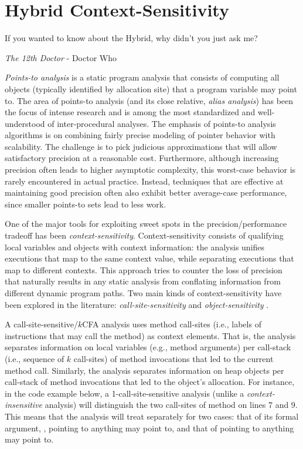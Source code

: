 \chapter{Hybrid Context-Sensitivity}\label{chapter:hybrid}

\epigraph{If you wanted to know about the Hybrid, why didn’t you just ask me?}{\textit{The 12th Doctor} - Doctor Who}

\emph{Points-to analysis} is a static program analysis that consists
of computing all objects (typically identified by allocation site)
that a program variable may point to. The area of points-to analysis
(and its close relative, \emph{alias analysis}) has been the focus of
intense research and is among the most standardized and
well-understood of inter-procedural analyses. The emphasis of
points-to analysis algorithms is on combining fairly precise modeling
of pointer behavior with scalability. The challenge is to pick
judicious approximations that will allow satisfactory precision at a
reasonable cost. Furthermore, although increasing precision often
leads to higher asymptotic complexity, this worst-case behavior is
rarely encountered in actual practice. Instead, techniques that are
effective at maintaining good precision often also exhibit better
average-case performance, since smaller points-to sets lead to less
work.

One of the major tools for exploiting sweet spots in the
precision/performance tradeoff has been \emph{context-sensitivity}.
Context-sensitivity consists of qualifying local variables and objects
with context information: the analysis unifies executions that map to
the same context value, while separating executions that map to
different contexts. This approach tries to counter the loss of
precision that naturally results in any static analysis from
conflating information from different dynamic program paths. Two main
kinds of context-sensitivity have been explored in the literature:
\emph{call-site-sensitivity}
\cite{col:1981:Sharir,thesis:Shivers} and
\emph{object-sensitivity}
\cite{issta:2002:Milanova,article:2005:Milanova,popl:2011:Smaragdakis}.

A call-site-sensitive/$k$CFA analysis uses method call-sites (i.e.,
labels of instructions that may call the method) as context elements.
That is, the analysis separates information on local variables (e.g.,
method arguments) per call-stack (i.e., sequence of $k$ call-sites) of
method invocations that led to the current method call. Similarly, the
analysis separates information on heap objects per call-stack of
method invocations that led to the object's allocation. For instance,
in the code example below, a 1-call-site-sensitive analysis (unlike a
\emph{context-insensitive} analysis) will distinguish the two
call-sites of method  on lines 7 and 9. This means that the
analysis will treat  separately for two cases: that of its
formal argument, , pointing to anything  may point to, and
that of  pointing to anything  may point to.

